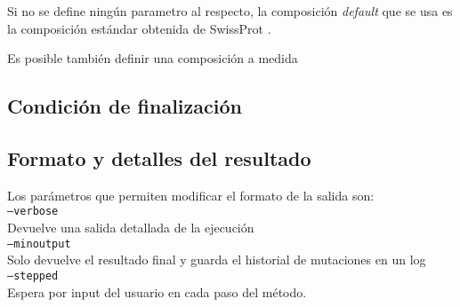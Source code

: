 Si no se define ningún parametro al respecto, la composición \textit{default} que se usa es la composición estándar obtenida de SwissProt \cite{compositionAA}.  

Es posible también definir una composición a medida


\subsection{Condición de finalización} \label{condicionFin}

\subsection{Formato y detalles del resultado}\label{output}
Los parámetros que permiten modificar el formato de la salida son:
\vspace{0.2cm}\\
\texttt{--verbose} \\
\indent \indent Devuelve una salida detallada de la ejecución \\
\texttt{--minoutput} \\
\indent \indent Solo devuelve el resultado final y guarda el historial de mutaciones en un log \\
\texttt{--stepped} \\
\indent \indent Espera por input del usuario en cada paso del método. \\
